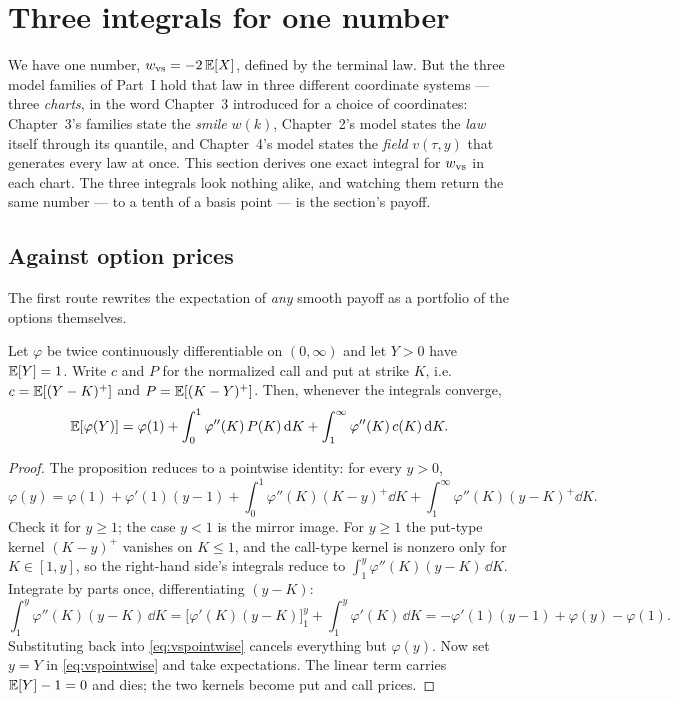 \section{Three integrals for one number}
\label{sec:vsthree}

We have one number, $w_{\rm vs}=-2\,\mathbb{E}[X]$, defined by the terminal
law.  But the three model families of Part~I hold that law in three
different coordinate systems --- three \emph{charts}, in the word
Chapter~3 introduced for a choice of coordinates: Chapter~3's families
state the \emph{smile} $w(k)$, Chapter~2's model states the \emph{law}
itself through its quantile, and Chapter~4's model states the
\emph{field} $v(\tau,y)$ that generates every law at once.  This
section derives one exact integral for $w_{\rm vs}$ in each chart.
The three integrals look nothing alike, and watching them return the
same number --- to a tenth of a basis point --- is the section's
payoff.

\subsection{Against option prices}

The first route rewrites the expectation of \emph{any} smooth payoff as
a portfolio of the options themselves.

\begin{proposition}[Spanning]
\label{prop:vsspanning}
Let $\varphi$ be twice continuously differentiable on $(0,\infty)$ and
let $Y>0$ have $\mathbb{E}[Y]=1$.  Write $c$ and $P$ for the normalized call
and put at strike $K$, i.e.\ $c=\mathbb{E}[(Y-K)^+]$ and $P=\mathbb{E}[(K-Y)^+]$.
Then, whenever the integrals converge,
\begin{equation}
\mathbb{E}[\varphi(Y)]
=\varphi(1)
+\int_0^{1}\varphi''(K)\,P(K)\,\mathrm{d} K
+\int_1^{\infty}\varphi''(K)\,c(K)\,\mathrm{d} K .
\label{eq:vsspanning}
\end{equation}
\end{proposition}

\begin{proof}
The proposition reduces to a pointwise identity: for every $y>0$,
\begin{equation}
\varphi(y)=\varphi(1)+\varphi'(1)(y-1)
+\int_0^{1}\varphi''(K)(K-y)^+\dd K
+\int_1^{\infty}\varphi''(K)(y-K)^+\dd K .
\label{eq:vspointwise}
\end{equation}
Check it for $y\ge1$; the case $y<1$ is the mirror image.  For
$y\ge1$ the put-type kernel $(K-y)^+$ vanishes on $K\le1$, and the
call-type kernel is nonzero only for $K\in[1,y]$, so the right-hand
side's integrals reduce to $\int_1^{y}\varphi''(K)(y-K)\,\dd K$.
Integrate by parts once, differentiating $(y-K)$:
\[
\int_1^{y}\varphi''(K)(y-K)\,\dd K
=\Big[\varphi'(K)(y-K)\Big]_1^{y}
+\int_1^{y}\varphi'(K)\,\dd K
=-\varphi'(1)(y-1)+\varphi(y)-\varphi(1).
\]
Substituting back into \eqref{eq:vspointwise} cancels everything but
$\varphi(y)$.  Now set $y=Y$ in \eqref{eq:vspointwise} and take
expectations.  The linear term carries $\mathbb{E}[Y]-1=0$ and dies; the two
kernels become put and call prices.
\end{proof}


